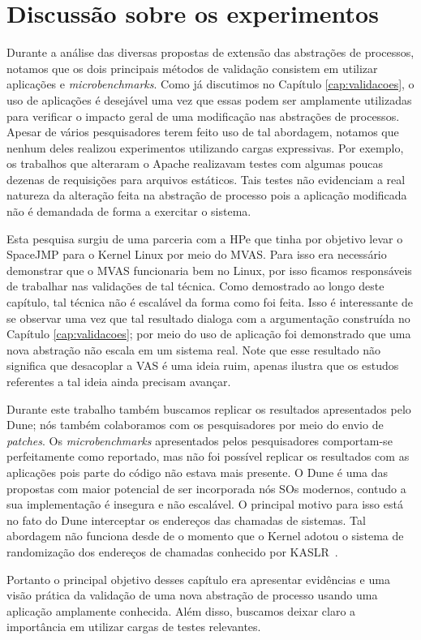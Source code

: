 \section{Discussão sobre os experimentos}

Durante a análise das diversas propostas de extensão das abstrações de
processos, notamos que os dois principais métodos de validação consistem em
utilizar aplicações e \textit{microbenchmarks}. Como já discutimos no Capítulo
\ref{cap:validacoes}, o uso de aplicações é desejável uma vez que essas podem
ser amplamente utilizadas para verificar o impacto geral de uma modificação nas
abstrações de processos. Apesar de vários pesquisadores terem feito uso de tal
abordagem, notamos que nenhum deles realizou experimentos utilizando cargas
expressivas. Por exemplo, os trabalhos que alteraram o Apache realizavam testes
com algumas poucas dezenas de requisições para arquivos estáticos. Tais testes
não evidenciam a real natureza da alteração feita na abstração de processo pois
a aplicação modificada não é demandada de forma a exercitar o sistema.

Esta pesquisa surgiu de uma parceria com a HPe que tinha por objetivo levar o
SpaceJMP para o Kernel Linux por meio do MVAS. Para isso era necessário
demonstrar que o MVAS funcionaria bem no Linux, por isso ficamos responsáveis
de trabalhar nas validações de tal técnica. Como demostrado ao longo deste
capítulo, tal técnica não é escalável da forma como foi feita. Isso é
interessante de se observar uma vez que tal resultado dialoga com a
argumentação construída no Capítulo \ref{cap:validacoes}; por meio do uso de
aplicação foi demonstrado que uma nova abstração não escala em um sistema real.
Note que esse resultado não significa que desacoplar a VAS é uma ideia ruim,
apenas ilustra que os estudos referentes a tal ideia ainda precisam avançar.

Durante este trabalho também buscamos replicar os resultados apresentados pelo
Dune; nós também colaboramos com os pesquisadores por meio do envio de
\textit{patches}. Os \textit{microbenchmarks} apresentados pelos pesquisadores
comportam-se perfeitamente como reportado, mas não foi possível replicar os
resultados com as aplicações pois parte do código não estava mais presente. O
Dune é uma das propostas com maior potencial de ser incorporada nós SOs
modernos, contudo a sua implementação é insegura e não escalável. O principal
motivo para isso está no fato do Dune interceptar os endereços das chamadas de
sistemas. Tal abordagem não funciona desde de o momento que o Kernel adotou o
sistema de randomização dos endereços de chamadas conhecido por
KASLR~\citep{kaslr}.

Portanto o principal objetivo desses capítulo era apresentar evidências e uma
visão prática da validação de uma nova abstração de processo usando uma
aplicação amplamente conhecida. Além disso, buscamos deixar claro a importância
em utilizar cargas de testes relevantes.
